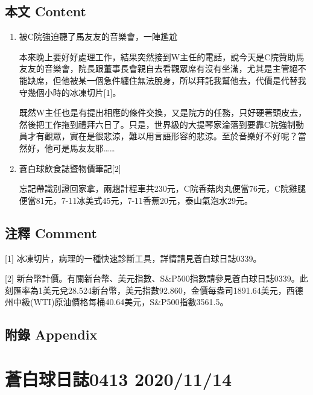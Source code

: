 \documentclass[
]{article}
\begin{document}
\hypertarget{ux672cux6587-content-9}{%
\subsection{本文 Content}\label{ux672cux6587-content-9}}

\begin{enumerate}
\def\labelenumi{\arabic{enumi}.}
\item
  被C院強迫聽了馬友友的音樂會，一陣尷尬

  本來晚上要好好處理工作，結果突然接到W主任的電話，說今天是C院贊助馬友友的音樂會，院長跟董事長會親自去看觀眾席有沒有坐滿，尤其是主管絕不能缺席，但他被某一個急件纏住無法脫身，所以拜託我幫他去，代價是代替我守幾個小時的冰凍切片{[}1{]}。

  既然W主任也是有提出相應的條件交換，又是院方的任務，只好硬著頭皮去，然後把工作拖到禮拜六日了。只是，世界級的大提琴家淪落到要靠C院強制動員才有觀眾，實在是很悲涼，難以用言語形容的悲涼。至於音樂好不好呢？當然好，他可是馬友友耶\ldots\ldots{}
\item
  蒼白球飲食誌暨物價筆記{[}2{]}

  忘記帶識別證回家拿，兩趟計程車共230元，C院香菇肉丸便當76元，C院雞腿便當81元，7-11冰美式45元，7-11香蕉20元，泰山氣泡水29元。
\end{enumerate}

\hypertarget{ux6ce8ux91cb-comment-9}{%
\subsection{注釋 Comment}\label{ux6ce8ux91cb-comment-9}}

{[}1{]} 冰凍切片，病理的一種快速診斷工具，詳情請見蒼白球日誌0339。

{[}2{]}
新台幣計價。有關新台幣、美元指數、S\&P500指數請參見蒼白球日誌0339。此刻匯率為1美元兌28.524新台幣，美元指數92.860，金價每盎司1891.64美元，西德州中級(WTI)原油價格每桶40.64美元，S\&P500指數3561.5。

\hypertarget{ux9644ux9304-appendix-9}{%
\subsection{附錄 Appendix}\label{ux9644ux9304-appendix-9}}

\hypertarget{ux84bcux767dux7403ux65e5ux8a8c0413-20201114}{%
\section{蒼白球日誌0413
2020/11/14}\label{ux84bcux767dux7403ux65e5ux8a8c0413-20201114}}
\end{document}
